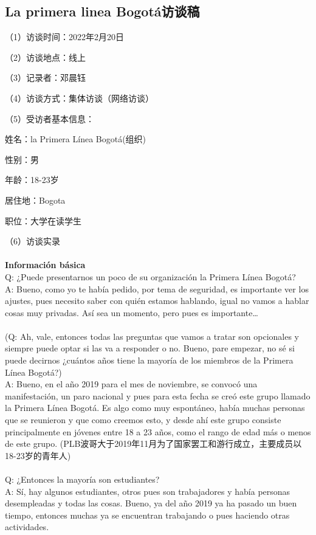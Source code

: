 \documentclass{phyasgn}\usepackage{nag}
\begin{document}
\subsection{La primera linea Bogotá访谈稿}
\par （1）访谈时间：2022年2月20日 
\par （2）访谈地点：线上
\par （3）记录者：邓晨钰
\par （4）访谈方式：集体访谈（网络访谈）
\par （5）受访者基本信息：
 \par  姓名：la Primera Línea Bogotá(组织)
\par 性别：男
\par 年龄：18-23岁
\par 居住地：Bogota
\par 职位：大学在读学生
\par （6）访谈实录\\
\\
\textbf{Información básica}\\
Q: ¿Puede presentarnos un poco de su organización la Primera Línea Bogotá?\\
A: Bueno, como yo te había pedido, por tema de seguridad, es importante ver los ajustes, pues necesito saber con quién estamos hablando, igual no vamos a hablar cosas muy privadas. Así sea un momento, pero pues es importante…\\
\\
(Q: Ah, vale, entonces todas las preguntas que vamos a tratar son opcionales y siempre puede optar si las va a responder o no. Bueno, pare empezar, no sé si puede decirnos ¿cuántos años tiene la mayoría de los miembros de la Primera Línea Bogotá?)\\
A: Bueno, en el año 2019 para el mes de noviembre, se convocó una manifestación, un paro nacional y pues para esta fecha se creó este grupo llamado la Primera Línea Bogotá. Es algo como muy espontáneo, había muchas personas que se reunieron y que como creemos esto, y desde ahí este grupo consiste principalmente en jóvenes entre 18 a 23 años, como el rango de edad más o menos de este grupo. (PLB波哥大于2019年11月为了国家罢工和游行成立，主要成员以18-23岁的青年人)\\
\\
Q: ¿Entonces la mayoría son estudiantes?\\
A: Sí, hay algunos estudiantes, otros pues son trabajadores y había personas desempleadas y todas las cosas. Bueno, ya del año 2019 ya ha pasado un buen tiempo, entonces muchas ya se encuentran trabajando o pues haciendo otras actividades.\\
\end{document}
